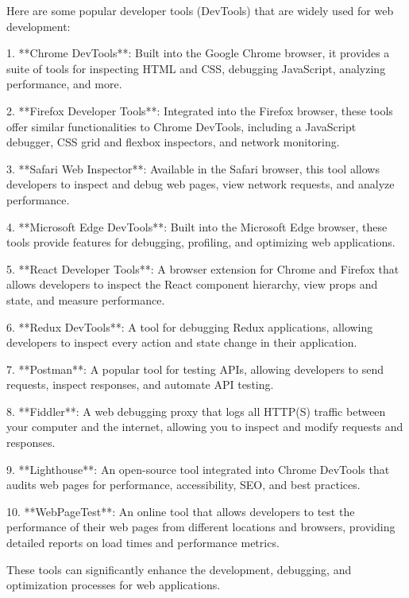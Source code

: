 Here are some popular developer tools (DevTools) that are widely used for web development:

1. **Chrome DevTools**: Built into the Google Chrome browser, it provides a suite of tools for inspecting HTML and CSS, debugging JavaScript, analyzing performance, and more.

2. **Firefox Developer Tools**: Integrated into the Firefox browser, these tools offer similar functionalities to Chrome DevTools, including a JavaScript debugger, CSS grid and flexbox inspectors, and network monitoring.

3. **Safari Web Inspector**: Available in the Safari browser, this tool allows developers to inspect and debug web pages, view network requests, and analyze performance.

4. **Microsoft Edge DevTools**: Built into the Microsoft Edge browser, these tools provide features for debugging, profiling, and optimizing web applications.

5. **React Developer Tools**: A browser extension for Chrome and Firefox that allows developers to inspect the React component hierarchy, view props and state, and measure performance.

6. **Redux DevTools**: A tool for debugging Redux applications, allowing developers to inspect every action and state change in their application.

7. **Postman**: A popular tool for testing APIs, allowing developers to send requests, inspect responses, and automate API testing.

8. **Fiddler**: A web debugging proxy that logs all HTTP(S) traffic between your computer and the internet, allowing you to inspect and modify requests and responses.

9. **Lighthouse**: An open-source tool integrated into Chrome DevTools that audits web pages for performance, accessibility, SEO, and best practices.

10. **WebPageTest**: An online tool that allows developers to test the performance of their web pages from different locations and browsers, providing detailed reports on load times and performance metrics.

These tools can significantly enhance the development, debugging, and optimization processes for web applications.
